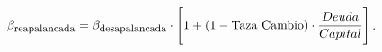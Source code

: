 \documentclass{standalone}
\begin{document}
\(\beta _{\mbox{\footnotesize reapalancada}} =
\beta _{\mbox{\footnotesize desapalancada}} \cdot 
\Bigg[1+(1- \mbox{Taza Cambio}) \cdot 
\dfrac{Deuda}{Capital}\Bigg]\).
\end{document}
